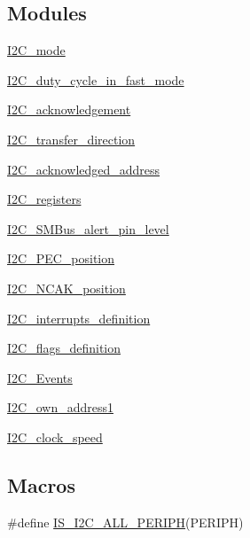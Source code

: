 \subsection*{Modules}
\begin{DoxyCompactItemize}
\item 
\hyperlink{group___i2_c__mode}{I2\+C\+\_\+mode}
\item 
\hyperlink{group___i2_c__duty__cycle__in__fast__mode}{I2\+C\+\_\+duty\+\_\+cycle\+\_\+in\+\_\+fast\+\_\+mode}
\item 
\hyperlink{group___i2_c__acknowledgement}{I2\+C\+\_\+acknowledgement}
\item 
\hyperlink{group___i2_c__transfer__direction}{I2\+C\+\_\+transfer\+\_\+direction}
\item 
\hyperlink{group___i2_c__acknowledged__address}{I2\+C\+\_\+acknowledged\+\_\+address}
\item 
\hyperlink{group___i2_c__registers}{I2\+C\+\_\+registers}
\item 
\hyperlink{group___i2_c___s_m_bus__alert__pin__level}{I2\+C\+\_\+\+S\+M\+Bus\+\_\+alert\+\_\+pin\+\_\+level}
\item 
\hyperlink{group___i2_c___p_e_c__position}{I2\+C\+\_\+\+P\+E\+C\+\_\+position}
\item 
\hyperlink{group___i2_c___n_c_a_k__position}{I2\+C\+\_\+\+N\+C\+A\+K\+\_\+position}
\item 
\hyperlink{group___i2_c__interrupts__definition}{I2\+C\+\_\+interrupts\+\_\+definition}
\item 
\hyperlink{group___i2_c__flags__definition}{I2\+C\+\_\+flags\+\_\+definition}
\item 
\hyperlink{group___i2_c___events}{I2\+C\+\_\+\+Events}
\item 
\hyperlink{group___i2_c__own__address1}{I2\+C\+\_\+own\+\_\+address1}
\item 
\hyperlink{group___i2_c__clock__speed}{I2\+C\+\_\+clock\+\_\+speed}
\end{DoxyCompactItemize}
\subsection*{Macros}
\begin{DoxyCompactItemize}
\item 
\#define \hyperlink{group___i2_c___exported___constants_ga2e57489a40603d6ab7ff115b94eeb303}{I\+S\+\_\+\+I2\+C\+\_\+\+A\+L\+L\+\_\+\+P\+E\+R\+I\+PH}(P\+E\+R\+I\+PH)
\end{DoxyCompactItemize}


